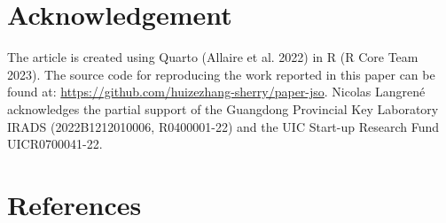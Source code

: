 \documentclass[
  12pt,
]{interact}
\theoremstyle{plain}
\begin{document}
\section{Acknowledgement}\label{acknowledgement}

The article is created using Quarto (Allaire et al. 2022) in R (R Core
Team 2023). The source code for reproducing the work reported in this
paper can be found at:
\url{https://github.com/huizezhang-sherry/paper-jso}. Nicolas Langrené
acknowledges the partial support of the Guangdong Provincial Key
Laboratory IRADS (2022B1212010006, R0400001-22) and the UIC Start-up
Research Fund UICR0700041-22.

\section*{References}\label{references}
\end{document}
